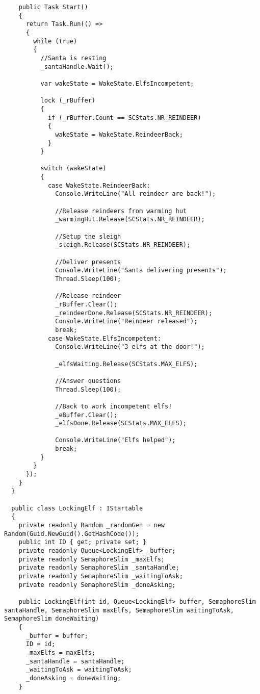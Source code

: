\begin{lstlisting}
    public Task Start()
    {
      return Task.Run(() =>
      {
        while (true)
        {
          //Santa is resting
          _santaHandle.Wait();

          var wakeState = WakeState.ElfsIncompetent;

          lock (_rBuffer)
          {
            if (_rBuffer.Count == SCStats.NR_REINDEER)
            {
              wakeState = WakeState.ReindeerBack;    
            }
          }

          switch (wakeState)
          {
            case WakeState.ReindeerBack:
              Console.WriteLine("All reindeer are back!");

              //Release reindeers from warming hut
              _warmingHut.Release(SCStats.NR_REINDEER);

              //Setup the sleigh
              _sleigh.Release(SCStats.NR_REINDEER);

              //Deliver presents
              Console.WriteLine("Santa delivering presents");
              Thread.Sleep(100);

              //Release reindeer
              _rBuffer.Clear();
              _reindeerDone.Release(SCStats.NR_REINDEER);
              Console.WriteLine("Reindeer released");
              break;
            case WakeState.ElfsIncompetent:
              Console.WriteLine("3 elfs at the door!");

              _elfsWaiting.Release(SCStats.MAX_ELFS);

              //Answer questions
              Thread.Sleep(100);

              //Back to work incompetent elfs!
              _eBuffer.Clear();
              _elfsDone.Release(SCStats.MAX_ELFS);

              Console.WriteLine("Elfs helped");
              break;
          }
        }
      });
    }
  }
  
  public class LockingElf : IStartable
  {
    private readonly Random _randomGen = new Random(Guid.NewGuid().GetHashCode());
    public int ID { get; private set; }
    private readonly Queue<LockingElf> _buffer;
    private readonly SemaphoreSlim _maxElfs;
    private readonly SemaphoreSlim _santaHandle;
    private readonly SemaphoreSlim _waitingToAsk;
    private readonly SemaphoreSlim _doneAsking;

    public LockingElf(int id, Queue<LockingElf> buffer, SemaphoreSlim santaHandle, SemaphoreSlim maxElfs, SemaphoreSlim waitingToAsk, SemaphoreSlim doneWaiting)
    {
      _buffer = buffer;
      ID = id;
      _maxElfs = maxElfs;
      _santaHandle = santaHandle;
      _waitingToAsk = waitingToAsk;
      _doneAsking = doneWaiting;
    }


\end{lstlisting}
